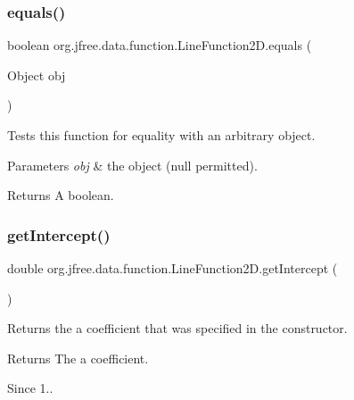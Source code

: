 \subsubsection{\texorpdfstring{equals()}{equals()}}
{\footnotesize\ttfamily boolean org.\+jfree.\+data.\+function.\+Line\+Function2\+D.\+equals (\begin{DoxyParamCaption}\item[{Object}]{obj }\end{DoxyParamCaption})}

Tests this function for equality with an arbitrary object.


\begin{DoxyParams}{Parameters}
{\em obj} & the object ({\ttfamily null} permitted).\\
\hline
\end{DoxyParams}
\begin{DoxyReturn}{Returns}
A boolean. 
\end{DoxyReturn}
\mbox{\label{classorg_1_1jfree_1_1data_1_1function_1_1_line_function2_d_a11ae023ff3f68ba1cd5b1777dc52b9fa}} 
\subsubsection{\texorpdfstring{get\+Intercept()}{getIntercept()}}
{\footnotesize\ttfamily double org.\+jfree.\+data.\+function.\+Line\+Function2\+D.\+get\+Intercept (\begin{DoxyParamCaption}{ }\end{DoxyParamCaption})}

Returns the \textquotesingle{}a\textquotesingle{} coefficient that was specified in the constructor.

\begin{DoxyReturn}{Returns}
The \textquotesingle{}a\textquotesingle{} coefficient.
\end{DoxyReturn}
\begin{DoxySince}{Since}
1.. 
\end{DoxySince}
\mbox{\label{classorg_1_1jfree_1_1data_1_1function_1_1_line_function2_d_ae4d72a69718f87825d222809f42cf847}} 

